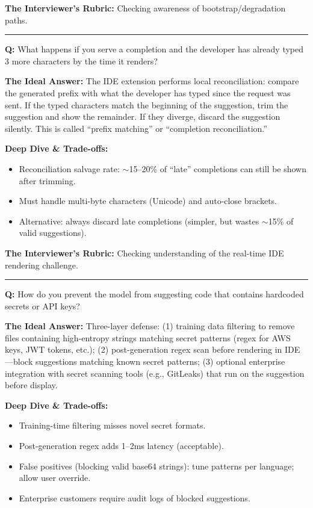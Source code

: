 \textbf{The Interviewer's Rubric:} Checking awareness of bootstrap/degradation paths.

\bigskip\hrule\bigskip

\textbf{Q:} What happens if you serve a completion and the developer has already typed 3 more characters by the time it renders?

\textbf{The Ideal Answer:} The IDE extension performs local reconciliation: compare the generated prefix with what the developer has typed since the request was sent. If the typed characters match the beginning of the suggestion, trim the suggestion and show the remainder. If they diverge, discard the suggestion silently. This is called ``prefix matching'' or ``completion reconciliation.''

\textbf{Deep Dive \& Trade-offs:}
\begin{itemize}
  \item Reconciliation salvage rate: $\sim$15--20\% of ``late'' completions can still be shown after trimming.
  \item Must handle multi-byte characters (Unicode) and auto-close brackets.
  \item Alternative: always discard late completions (simpler, but wastes $\sim$15\% of valid suggestions).
\end{itemize}

\textbf{The Interviewer's Rubric:} Checking understanding of the real-time IDE rendering challenge.

\bigskip\hrule\bigskip

\textbf{Q:} How do you prevent the model from suggesting code that contains hardcoded secrets or API keys?

\textbf{The Ideal Answer:} Three-layer defense: (1) training data filtering to remove files containing high-entropy strings matching secret patterns (regex for AWS keys, JWT tokens, etc.); (2) post-generation regex scan before rendering in IDE---block suggestions matching known secret patterns; (3) optional enterprise integration with secret scanning tools (e.g., GitLeaks) that run on the suggestion before display.

\textbf{Deep Dive \& Trade-offs:}
\begin{itemize}
  \item Training-time filtering misses novel secret formats.
  \item Post-generation regex adds 1--2ms latency (acceptable).
  \item False positives (blocking valid base64 strings): tune patterns per language; allow user override.
  \item Enterprise customers require audit logs of blocked suggestions.
\end{itemize}

